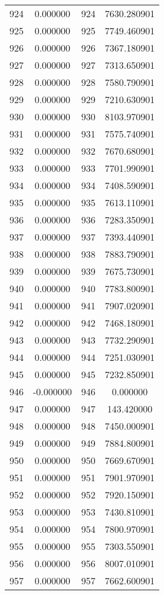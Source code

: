 \documentclass[12pt]{article}
\begin{document}
\begin{longtable}{@{}cccc@{}}
924 & 0.000000 & 924 & 7630.280901 \\
925 & 0.000000 & 925 & 7749.460901 \\
926 & 0.000000 & 926 & 7367.180901 \\
927 & 0.000000 & 927 & 7313.650901 \\
928 & 0.000000 & 928 & 7580.790901 \\
929 & 0.000000 & 929 & 7210.630901 \\
930 & 0.000000 & 930 & 8103.970901 \\
931 & 0.000000 & 931 & 7575.740901 \\
932 & 0.000000 & 932 & 7670.680901 \\
933 & 0.000000 & 933 & 7701.990901 \\
934 & 0.000000 & 934 & 7408.590901 \\
935 & 0.000000 & 935 & 7613.110901 \\
936 & 0.000000 & 936 & 7283.350901 \\
937 & 0.000000 & 937 & 7393.440901 \\
938 & 0.000000 & 938 & 7883.790901 \\
939 & 0.000000 & 939 & 7675.730901 \\
940 & 0.000000 & 940 & 7783.800901 \\
941 & 0.000000 & 941 & 7907.020901 \\
942 & 0.000000 & 942 & 7468.180901 \\
943 & 0.000000 & 943 & 7732.290901 \\
944 & 0.000000 & 944 & 7251.030901 \\
945 & 0.000000 & 945 & 7232.850901 \\
946 & -0.000000 & 946 & 0.000000 \\
947 & 0.000000 & 947 & 143.420000 \\
948 & 0.000000 & 948 & 7450.000901 \\
949 & 0.000000 & 949 & 7884.800901 \\
950 & 0.000000 & 950 & 7669.670901 \\
951 & 0.000000 & 951 & 7901.970901 \\
952 & 0.000000 & 952 & 7920.150901 \\
953 & 0.000000 & 953 & 7430.810901 \\
954 & 0.000000 & 954 & 7800.970901 \\
955 & 0.000000 & 955 & 7303.550901 \\
956 & 0.000000 & 956 & 8007.010901 \\
957 & 0.000000 & 957 & 7662.600901 \\

\end{longtable}
\end{document}
